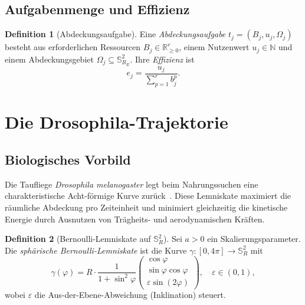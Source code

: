 ﻿\documentclass[a4paper,12pt]{article}
\theoremstyle{definition}
\newtheorem{definition}{Definition}[section]
\newcommand{\N}{\mathbb{N}}
\newcommand{\Rnn}{\mathbb{R}_{\geq 0}}
\begin{document}
\subsection{Aufgabenmenge und Effizienz}

\begin{definition}[Abdeckungsaufgabe]
Eine \emph{Abdeckungsaufgabe} $t_j = (B_j, u_j, \Omega_j)$ besteht aus
erforderlichen Ressourcen $B_j \in \Rnn^r$,
einem Nutzenwert $u_j \in \N$ und
einem Abdeckungsgebiet $\Omega_j \subseteq \mathbb{S}^2_{R_E}$.
Ihre \emph{Effizienz} ist
\begin{equation}
  e_j = \frac{u_j}{\sum_{p=1}^r b_j^p}.
  \label{eq:efficiency}
\end{equation}
\end{definition}

\section{Die Drosophila-Trajektorie}
\label{sec:trajectory}

\subsection{Biologisches Vorbild}

Die Taufliege \emph{Drosophila melanogaster} legt beim Nahrungssuchen
eine charakteristische Acht-f\"ormige Kurve zur\"uck~\cite{Floreano15}.
Diese Lemniskate maximiert die r\"aumliche Abdeckung pro Zeiteinheit
und minimiert gleichzeitig die kinetische Energie durch Ausnutzen von
Tr\"agheits- und aerodynamischen Kr\"aften.

\begin{definition}[Bernoulli-Lemniskate auf $\mathbb{S}^2_R$]
\label{def:lemniscate}
Sei $a > 0$ ein Skalierungsparameter. Die \emph{sph\"arische Bernoulli-Lemniskate}
ist die Kurve $\gamma : [0, 4\pi] \to \mathbb{S}^2_R$ mit
\begin{equation}
  \gamma(\varphi) =
  R \cdot \frac{1}{1 + \sin^2\varphi}
  \begin{pmatrix}
    \cos\varphi \\
    \sin\varphi\cos\varphi \\
    \varepsilon \sin(2\varphi)
  \end{pmatrix},
  \quad \varepsilon \in (0,1),
  \label{eq:lemnis}
\end{equation}
wobei $\varepsilon$ die Aus-der-Ebene-Abweichung (Inklination) steuert.
\end{definition}
\end{document}
